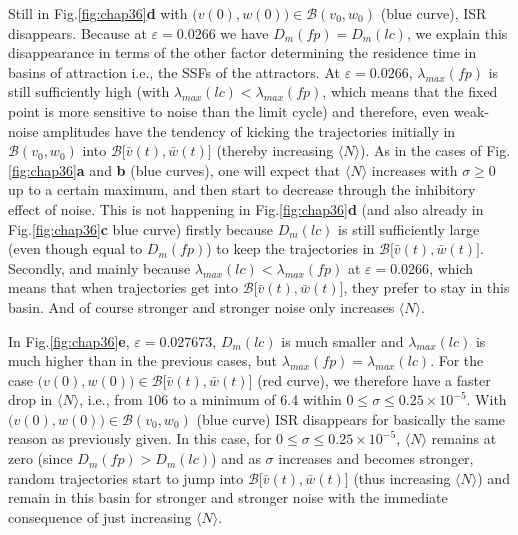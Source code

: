 Still in Fig.\ref{fig:chap36}\textbf{d} with
$\big(v(0),w(0)\big)\in\mathcal{B}(v_0,w_0)$ (blue curve), ISR disappears.
Because at $\varepsilon=0.0266$ we have $D_{m}(fp)=D_{m}(lc)$, we explain this 
disappearance in terms of
the other factor determining the residence time in basins of
attraction i.e., the SSFs of the
attractors. At $\varepsilon=0.0266$, $\lambda_{max}(fp)$ is still
sufficiently high (with $\lambda_{max}(lc)<\lambda_{max}(fp)$,
which means that the fixed point is more sensitive to noise than
the limit cycle) and therefore, even weak-noise amplitudes have the
tendency of kicking the trajectories initially in
$\mathcal{B}(v_0,w_0)$ into
$\mathcal{B}\big[\bar{v}(t),\bar{w}(t)\big]$ (thereby increasing
$\langle N\rangle$). As in the cases of Fig.\ref{fig:chap36}\textbf{a} and \textbf{b} (blue curves),
one will expect that $\langle N\rangle$ increases with $\sigma\geq0$ up to a
certain maximum, and then start to decrease through the inhibitory
effect of noise. This is not happening in Fig.\ref{fig:chap36}\textbf{d} (and also already in 
Fig.\ref{fig:chap36}\textbf{c} blue curve)
firstly because $D_{m}(lc)$ is still sufficiently large (even though equal
to $D_{m}(fp)$) to keep the trajectories in
$\mathcal{B}\big[\bar{v}(t),\bar{w}(t)\big]$. Secondly, and mainly because 
$\lambda_{max}(lc)<\lambda_{max}(fp)$ at
$\varepsilon=0.0266$, which means that when trajectories get into $\mathcal{B}\big[\bar{v}(t),\bar{w}(t)\big]$,
they prefer to stay in this basin. And of course stronger
and stronger noise only increases $\langle N\rangle$.

In Fig.\ref{fig:chap36}\textbf{e}, $\varepsilon=0.027673$, $D_{m}(lc)$
is much smaller and $\lambda_{max}(lc)$ is much higher than in the
previous cases, but $\lambda_{max}(fp)=\lambda_{max}(lc)$. For the case
$\big(v(0),w(0)\big)\in\mathcal{B}\big[\bar{v}(t),\bar{w}(t)\big]$
(red curve), we therefore have a faster drop in $\langle N\rangle$, i.e., from
$106$ to a minimum of $6.4$ within
$0\leq\sigma\leq0.25\times10^{-5}$.  With
$\big(v(0),w(0)\big)\in\mathcal{B}(v_0,w_0)$ (blue curve) ISR
disappears for basically the same reason as previously given. In this
case, for $0\leq\sigma\leq0.25\times10^{-5}$, $\langle N\rangle$ remains at
zero (since $D_m(fp)>D_m(lc)$) and as $\sigma$ increases and becomes stronger, random trajectories start to jump into
$\mathcal{B}\big[\bar{v}(t),\bar{w}(t)\big]$ (thus increasing $\langle N\rangle$)
and remain in this basin for stronger and stronger noise with the
immediate consequence of just increasing $\langle N\rangle$.


